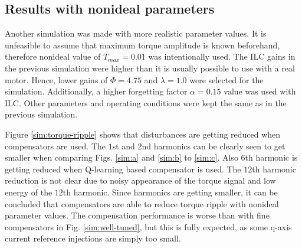 




\subsection{Results with nonideal parameters}
Another simulation was made with more realistic parameter values. It is unfeasible to assume that maximum torque amplitude is known beforehand, therefore nonideal value of $T_{max}=0.01$ was intentionally used. The ILC gains in the previous simulation were higher than it is usually possible to use with a real motor. Hence, lower gains of $\Phi = 4.75$ and $\lambda = 1.0$ were selected for the simulation. Additionally, a higher forgetting factor $\alpha = 0.15$ value was used with ILC. Other parameters and operating conditions were kept the same as in the previous simulation.

Figure \ref{sim:torque-ripple} shows that disturbances are getting reduced when compensators are used. The $1$st and $2$nd harmonics can be clearly seen to get smaller when comparing Figs. \ref{sim:a} and \ref{sim:b} to \ref{sim:c}. Also $6$th harmonic is getting reduced when Q-learning based compensator is used. The $12$th harmonic reduction is not clear due to noisy appearance of the torque signal and low energy of the $12$th harmonic. Since harmonics are getting smaller, it can be concluded that compensators are able to reduce torque ripple with nonideal parameter values. The compensation performance is worse than with fine compensators in Fig. \ref{sim:well-tuned}, but this is fully expected, as some q-axis current reference injections are simply too small.

